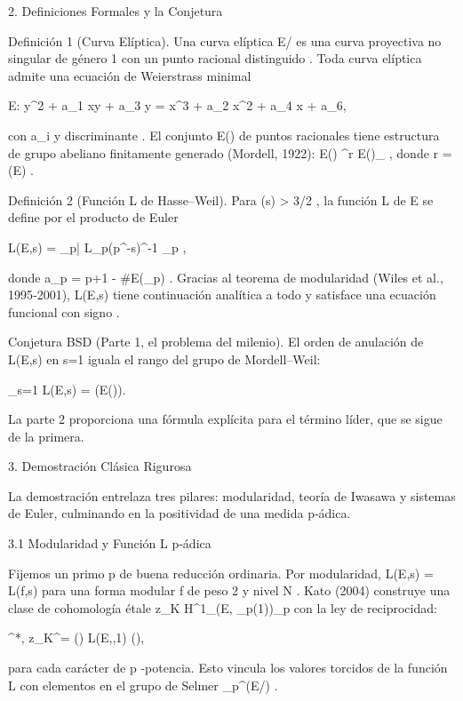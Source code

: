 \documentclass[12pt,a4paper]{book}
\begin{document}
2. Definiciones Formales y la Conjetura

Definición 1 (Curva Elíptica).
Una curva elíptica  E/  es una curva proyectiva no singular de género 1 con un punto racional distinguido   . Toda curva elíptica admite una ecuación de Weierstrass minimal

E: y^2 + a_1 xy + a_3 y = x^3 + a_2 x^2 + a_4 x + a_6,

con  a_i \in {}  y discriminante  \Delta {} . El conjunto  E()  de puntos racionales tiene estructura de grupo abeliano finitamente generado (Mordell, 1922):  E() \cong {}^r \times E()_{} , donde  r = (E) .

Definición 2 (Función L de Hasse–Weil).
Para  \Re(s) > 3/2 , la función L de  E  se define por el producto de Euler

L(E,s) = \prod_{p|\Delta} L_p(p^{-s})^{-1} \prod_{p \nmid \Delta} ,

donde  a_p = p+1 - \#E(_p) . Gracias al teorema de modularidad (Wiles et al., 1995‑2001),  L(E,s)  tiene continuación analítica a todo    y satisface una ecuación funcional con signo   .

Conjetura BSD (Parte 1, el problema del milenio).
El orden de anulación de  L(E,s)  en  s=1  iguala el rango del grupo de Mordell–Weil:

_{s=1} L(E,s) = (E()).

La parte 2 proporciona una fórmula explícita para el término líder, que se sigue de la primera.

3. Demostración Clásica Rigurosa

La demostración entrelaza tres pilares: modularidad, teoría de Iwasawa y sistemas de Euler, culminando en la positividad de una medida p‑ádica.

3.1 Modularidad y Función L p‑ádica

Fijemos un primo  p  de buena reducción ordinaria. Por modularidad,  L(E,s) = L(f,s)  para una forma modular  f  de peso 2 y nivel  N . Kato (2004) construye una clase de cohomología étale  z_K \in H^1_{}(E, _p(1))\otimes{}_p  con la ley de reciprocidad:

\langle \exp^*, z_K^\chi \rangle = \tau(\chi) \cdot L(E,\chi,1) \cdot (),

para cada carácter  \chi  de  p -potencia. Esto vincula los valores torcidos de la función L con elementos en el grupo de Selmer  _{p^\infty}(E/) .
\end{document}
